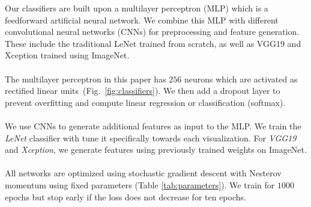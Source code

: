 \documentclass[journal]{vgtc}                %
\begin{document}
Our classifiers are built upon a multilayer perceptron (MLP) which is a feedforward artificial neural network. We combine this MLP with different convolutional neural networks (CNNs) for preprocessing and feature generation. These include the traditional LeNet trained from scratch, as well as VGG19 and Xception trained using ImageNet.
\\~\\
 The multilayer perceptron in this paper has $256$ neurons which are activated as rectified linear units~(Fig.~\ref{fig:classifiers}). We then add a dropout layer to prevent overfitting and compute linear regression or classification (softmax).
\\~\\
 We use CNNs to generate additional features as input to the MLP. We train the \emph{LeNet} classifier with tune it specifically towards each visualization. For \emph{VGG19} and \emph{Xception}, we generate features using previously trained weights on ImageNet.
\\~\\
 All networks are optimized using stochastic gradient descent with Nesterov momentum using fixed parameters (Table \ref{tab:parameters}). We train for $1000$ epochs but stop early if the loss does not decrease for ten epochs.
\end{document}
